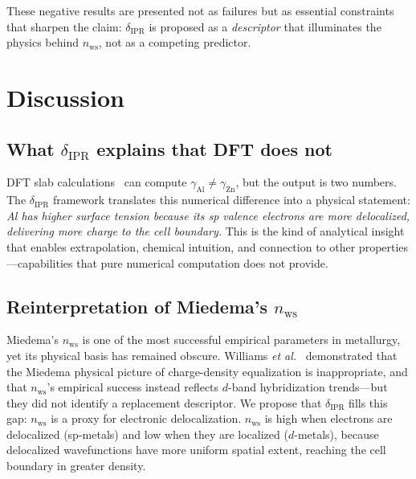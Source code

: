 \documentclass[twocolumn,showpacs,preprintnumbers,amsmath,amssymb,prb]{revtex4-2}
\begin{document}
These negative results are presented not as failures but as
essential constraints that sharpen the claim:
$\delta_\mathrm{IPR}$ is proposed as a \emph{descriptor}
that illuminates the physics behind $n_\mathrm{ws}$,
not as a competing predictor.


\section{Discussion}
\label{sec:discussion}

\subsection{What $\delta_\mathrm{IPR}$ explains that DFT does not}

DFT slab calculations~\cite{Vitos1998,Tran2016} can compute
$\gamma_\mathrm{Al} \neq \gamma_\mathrm{Zn}$, but the
output is two numbers.
The $\delta_\mathrm{IPR}$ framework translates this numerical
difference into a physical statement:
\emph{Al has higher surface tension because its sp valence
electrons are more delocalized, delivering more charge to
the cell boundary.}
This is the kind of analytical insight that enables
extrapolation, chemical intuition, and connection to other
properties---capabilities that pure numerical computation
does not provide.

\subsection{Reinterpretation of Miedema's $n_\mathrm{ws}$}

Miedema's $n_\mathrm{ws}$ is one of the most successful
empirical parameters in metallurgy, yet its physical basis
has remained obscure.
Williams \textit{et al.}~\cite{WilliamsGelattMoruzzi1980}
demonstrated that the Miedema physical picture of
charge-density equalization is inappropriate,
and that $n_\mathrm{ws}$'s empirical success instead
reflects $d$-band hybridization trends---but they did not
identify a replacement descriptor.
We propose that $\delta_\mathrm{IPR}$ fills this gap:
$n_\mathrm{ws}$ is a proxy for
electronic delocalization.
$n_\mathrm{ws}$ is high when electrons are delocalized
(sp-metals) and low when they are localized ($d$-metals),
because delocalized wavefunctions have more uniform
spatial extent, reaching the cell boundary in greater density.
\end{document}
